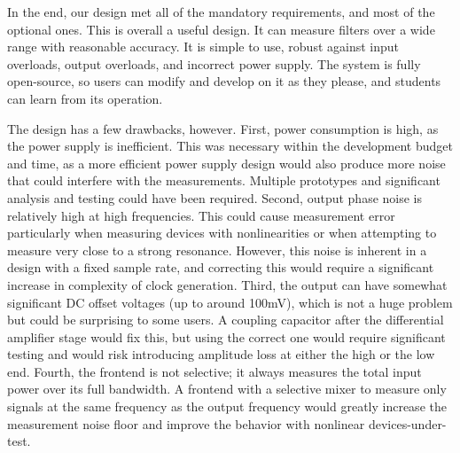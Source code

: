 In the end, our design met all of the mandatory requirements, and most of the optional ones.
This is overall a useful design. It can measure filters over a wide range with reasonable
accuracy. It is simple to use, robust against input overloads, output overloads, and incorrect
power supply. The system is fully open-source, so users can modify and develop on it as they
please, and students can learn from its operation.

The design has a few drawbacks, however. First, power consumption is high, as the power supply
is inefficient. This was necessary within the development budget and time, as a more efficient
power supply design would also produce more noise that could interfere with the measurements.
Multiple prototypes and significant analysis and testing could have been required. Second,
output phase noise is relatively high at high frequencies. This could cause measurement error
particularly when measuring devices with nonlinearities or when attempting to measure very close
to a strong resonance. However, this noise is inherent in a design with a fixed sample rate, and
correcting this would require a significant increase in complexity of clock generation. Third,
the output can have somewhat significant DC offset voltages (up to around 100mV), which is not
a huge problem but could be surprising to some users. A coupling capacitor after the differential
amplifier stage would fix this, but using the correct one would require significant testing and
would risk introducing amplitude loss at either the high or the low end. Fourth, the frontend
is not selective; it always measures the total input power over its full bandwidth. A frontend
with a selective mixer to measure only signals at the same frequency as the output frequency
would greatly increase the measurement noise floor and improve the behavior with nonlinear
devices-under-test.

